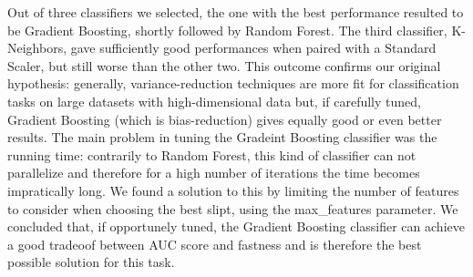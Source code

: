 \documentclass[11pt]{article}
\begin{document}
Out of three classifiers we selected, the one with the best performance
resulted to be Gradient Boosting, shortly followed by Random Forest. The
third classifier, K-Neighbors, gave sufficiently good performances when
paired with a Standard Scaler, but still worse than the other two. This
outcome confirms our original hypothesis: generally, variance-reduction
techniques are more fit for classification tasks on large datasets with
high-dimensional data but, if carefully tuned, Gradient Boosting (which
is bias-reduction) gives equally good or even better results. The main
problem in tuning the Gradeint Boosting classifier was the running time:
contrarily to Random Forest, this kind of classifier can not parallelize
and therefore for a high number of iterations the time becomes
impratically long. We found a solution to this by limiting the number of
features to consider when choosing the best slipt, using the
max\_features parameter. We concluded that, if opportunely tuned, the
Gradient Boosting classifier can achieve a good tradeoof between AUC
score and fastness and is therefore the best possible solution for this
task.


    
    
    
    
\end{document}
